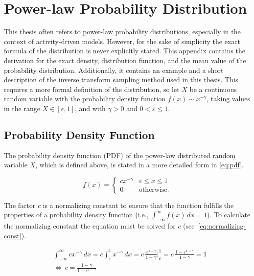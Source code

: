 \chapter{Power-law Probability Distribution}


This thesis often refers to power-law probability distributions, especially in the context of activity-driven models.
However, for the sake of simplicity the exact formula of the distribution is never explicitly stated.
This appendix contains the derivation for the exact density, distribution function, and the mean value of the probability distribution.
Additionally, it contains an example and a short description of the inverse transform sampling method used in this thesis.
This requires a more formal definition of the distribution, so let \(X\) be a continuous random variable with the probability density function \(f(x) \sim x^{-\gamma}\), taking values in the range \(X \in [\epsilon, 1]\), and with \(\gamma > 0\) and \(0 < \varepsilon \leq 1\).




\section{Probability Density Function}
\label{sec:pdf}

The probability density function (PDF) of the power-law distributed random variable \(X\), which is defined above, is stated in a more detailed form in \autoref{eq:pdf}.

\begin{equation}
	f(x) =
	\begin{cases}
		c x^{-\gamma} & \varepsilon \leq x \leq 1 \\
		0             & \text{otherwise.}
	\end{cases}
	\label{eq:pdf}
\end{equation}

The factor \(c\) is a normalizing constant to ensure that the function fulfills the properties of a probability density function (i.e., \(\int_{-\infty}^{\infty} f(x) \, dx = 1\)).
To calculate the normalizing constant the equation must be solved for \(c\) (see~\autoref{eq:normalizing-const}).

\begin{align}
	& \int_{-\infty}^{\infty} cx^{-\gamma} \, dx = c \int_{\varepsilon}^{1} x^{-\gamma} \, dx = c \, \frac{x^{1-\gamma}}{1-\gamma}  \bigg |_{\varepsilon}^{1} = c \, \frac{1 - \varepsilon^{1-\gamma}}{1-\gamma} = 1 \\
	& \Leftrightarrow \, c = \frac{1-\gamma}{1 - \varepsilon^{1-\gamma}}
	\label{eq:normalizing-const}
\end{align}


